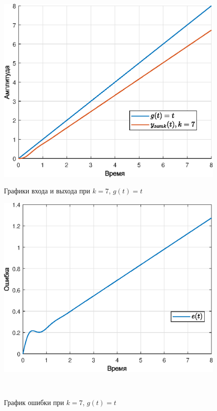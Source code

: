\documentclass[a4paper]{article}
\begin{document}
\begin{figure}[H]
    \begin{minipage}{0.5\textwidth}
        \centering \includegraphics[width=\textwidth]{ex3/k7_g_vt.eps}
        \caption{Графики входа и выхода при $k=7$, $g(t)=t$}
    \end{minipage}\hfill
    \begin{minipage}{0.5\textwidth}
        \centering \includegraphics[width=\textwidth]{ex3/k7_g_vt_error.eps}
        \caption{График ошибки при $k=7$, $g(t)=t$}
    \end{minipage}\\[1em]
\end{figure}\noindent\
\end{document}
